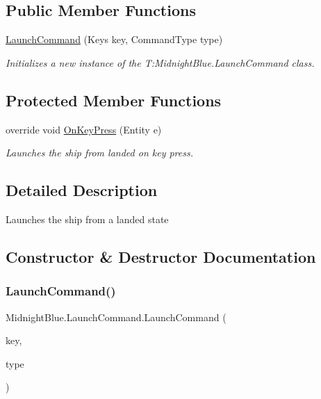 \subsection*{Public Member Functions}
\begin{DoxyCompactItemize}
\item 
\hyperlink{class_midnight_blue_1_1_launch_command_af557e1d21514b76f8adb28fd5c43d279}{Launch\+Command} (Keys key, Command\+Type type)
\begin{DoxyCompactList}\small\item\em Initializes a new instance of the T\+:\+Midnight\+Blue.\+Launch\+Command class. \end{DoxyCompactList}\end{DoxyCompactItemize}
\subsection*{Protected Member Functions}
\begin{DoxyCompactItemize}
\item 
override void \hyperlink{class_midnight_blue_1_1_launch_command_a5da2fdd898111ea59f4f63126c380a3e}{On\+Key\+Press} (Entity e)
\begin{DoxyCompactList}\small\item\em Launches the ship from landed on key press. \end{DoxyCompactList}\end{DoxyCompactItemize}


\subsection{Detailed Description}
Launches the ship from a landed state 



\subsection{Constructor \& Destructor Documentation}
\hypertarget{class_midnight_blue_1_1_launch_command_af557e1d21514b76f8adb28fd5c43d279}{}\label{class_midnight_blue_1_1_launch_command_af557e1d21514b76f8adb28fd5c43d279} 
\subsubsection{\texorpdfstring{Launch\+Command()}{LaunchCommand()}}
{\footnotesize\ttfamily Midnight\+Blue.\+Launch\+Command.\+Launch\+Command (\begin{DoxyParamCaption}\item[{Keys}]{key,  }\item[{Command\+Type}]{type }\end{DoxyParamCaption})\hspace{0.3cm}{\ttfamily [inline]}}



